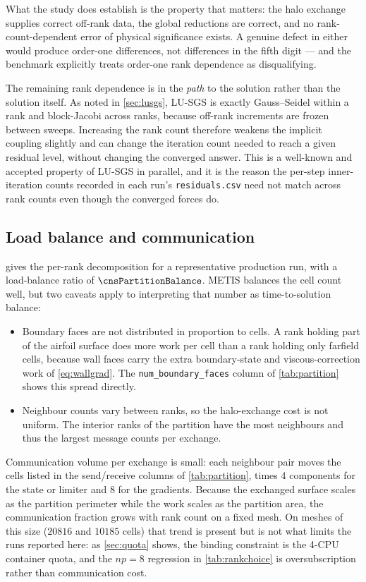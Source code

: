What the study does establish is the property that matters: the halo exchange
supplies correct off-rank data, the global reductions are correct, and no
rank-count-dependent error of physical significance exists. A genuine defect in
either would produce order-one differences, not differences in the fifth digit ---
and the benchmark explicitly treats order-one rank dependence as disqualifying.

The remaining rank dependence is in the \emph{path} to the solution rather than
the solution itself. As noted in \cref{sec:lusgs}, LU-SGS is exactly Gauss--Seidel
within a rank and block-Jacobi across ranks, because off-rank increments are
frozen between sweeps. Increasing the rank count therefore weakens the implicit
coupling slightly and can change the iteration count needed to reach a given
residual level, without changing the converged answer. This is a well-known and
accepted property of LU-SGS in parallel, and it is the reason the per-step
inner-iteration counts recorded in each run's \texttt{residuals.csv} need not match
across rank counts even though the converged forces do.

\subsection{Load balance and communication}

 gives the per-rank decomposition for a representative
production run, with a load-balance ratio of $\cnsPartitionBalance$. METIS
balances the cell count well, but two caveats apply to interpreting that number as
time-to-solution balance:

\begin{itemize}
  \item Boundary faces are not distributed in proportion to cells. A rank holding
  part of the airfoil surface does more work per cell than a rank holding only
  farfield cells, because wall faces carry the extra boundary-state and
  viscous-correction work of \cref{eq:wallgrad}. The
  \texttt{num\_boundary\_faces} column of \cref{tab:partition} shows this spread
  directly.
  \item Neighbour counts vary between ranks, so the halo-exchange cost is not
  uniform. The interior ranks of the partition have the most neighbours and thus
  the largest message counts per exchange.
\end{itemize}

Communication volume per exchange is small: each neighbour pair moves the cells
listed in the send/receive columns of \cref{tab:partition}, times 4 components for
the state or limiter and 8 for the gradients. Because the exchanged surface scales
as the partition perimeter while the work scales as the partition area, the
communication fraction grows with rank count on a fixed mesh. On meshes of this
size ($\num{20816}$ and $\num{10185}$ cells) that trend is present but is not what
limits the runs reported here: as \cref{sec:quota} shows, the binding constraint is
the 4-CPU container quota, and the $np=8$ regression in \cref{tab:rankchoice} is
oversubscription rather than communication cost.

